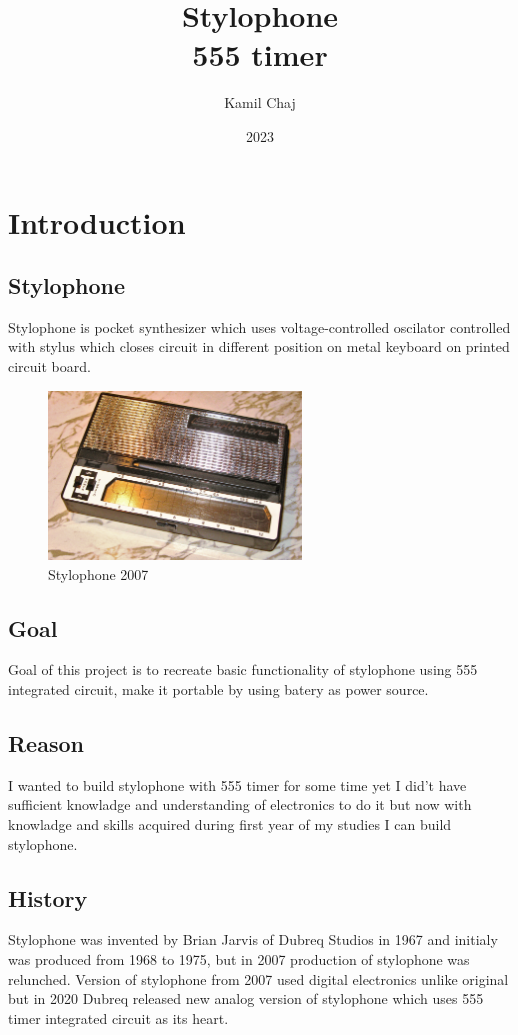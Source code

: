 \documentclass[english,10pt,a4paper]{article}
\title{Stylophone\\
	\normalsize 555 timer}
\author{Kamil Chaj}
\date{2023}
\begin{document}
	\maketitle
	
	\section{Introduction}
	
	\subsection{Stylophone}
	Stylophone is pocket synthesizer which uses voltage-controlled oscilator controlled with stylus which closes circuit in different position on metal keyboard on printed circuit board.
	\begin{figure}[H]
		\centering
		\includegraphics[width=0.6\textwidth]{img/Modern_Stylophone.jpg}
		\caption{Stylophone 2007}
	\end{figure}
	
	\subsection{Goal}
	Goal of this project is to recreate basic functionality of stylophone using 555 integrated circuit, make it portable by using batery as power source.
	
	\subsection{Reason}
	I wanted to build stylophone with 555 timer for some time yet I did't have sufficient knowladge and understanding of electronics to do it but now with knowladge and skills acquired during first year of my studies I can build stylophone.
	
	\subsection{History}
	Stylophone was invented by Brian Jarvis of Dubreq Studios in 1967 and initialy was produced from 1968 to 1975, but in 2007 production of stylophone was relunched. Version of stylophone from 2007 used digital electronics unlike original but in 2020 Dubreq released new analog version of stylophone which uses 555 timer integrated circuit as its heart.
	
\end{document}
